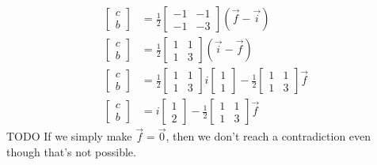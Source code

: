 \documentclass[letterpaper, 12pt]{article}
\begin{document}
\begin{align*}
    \begin{bmatrix}
        c\\
        b
    \end{bmatrix}
    &=
    \frac{1}{2}
    \begin{bmatrix}
        -1 &-1\\
        -1 &-3
    \end{bmatrix}
    (\vec{f} - \vec{i})\\
    \begin{bmatrix}
        c\\
        b
    \end{bmatrix}
    &=
    \frac{1}{2}
    \begin{bmatrix}
        1 & 1\\
        1 & 3
    \end{bmatrix}
    (\vec{i} - \vec{f})\\
    \begin{bmatrix}
        c\\
        b
    \end{bmatrix}
    &=
    \frac{1}{2}
    \begin{bmatrix}
        1 & 1\\
        1 & 3
    \end{bmatrix}
    i
    \begin{bmatrix}
        1\\
        1
    \end{bmatrix}
    -
    \frac{1}{2}
    \begin{bmatrix}
        1 & 1\\
        1 & 3
    \end{bmatrix}
    \vec{f}\\
    \begin{bmatrix}
        c\\
        b
    \end{bmatrix}
    &=
    i
    \begin{bmatrix}
        1\\
        2
    \end{bmatrix}
    -
    \frac{1}{2}
    \begin{bmatrix}
        1 & 1\\
        1 & 3
    \end{bmatrix}
    \vec{f}
\end{align*}
{
    \color{red}
    TODO
    If we simply make $\vec{f} = \vec{0}$, then we don't reach a contradiction even though that's not possible.
}
\end{document}
